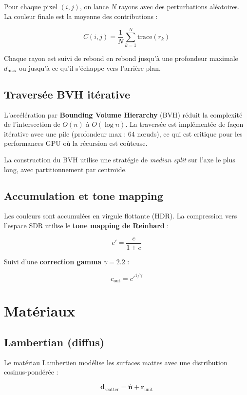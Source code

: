 \documentclass[12pt,a4paper]{article}
\begin{document}
Pour chaque pixel $(i, j)$, on lance $N$ rayons avec des perturbations aléatoires.
La couleur finale est la moyenne des contributions :

\[
C(i,j) = \frac{1}{N} \sum_{k=1}^{N} \text{trace}(r_k)
\]

Chaque rayon est suivi de rebond en rebond jusqu'à une profondeur maximale $d_{\max}$
ou jusqu'à ce qu'il s'échappe vers l'arrière-plan.

\subsection{Traversée BVH itérative}

L'accélération par \textbf{Bounding Volume Hierarchy} (BVH) réduit la complexité
de l'intersection de $O(n)$ à $O(\log n)$. La traversée est implémentée de façon
itérative avec une pile (profondeur max : 64 nœuds), ce qui est critique pour
les performances GPU où la récursion est coûteuse.

La construction du BVH utilise une stratégie de \textit{median split} sur l'axe
le plus long, avec partitionnement par centroïde.

\subsection{Accumulation et tone mapping}

Les couleurs sont accumulées en virgule flottante (HDR). La compression vers
l'espace SDR utilise le \textbf{tone mapping de Reinhard} :

\[
c' = \frac{c}{1 + c}
\]

Suivi d'une \textbf{correction gamma} $\gamma = 2.2$ :

\[
c_{\text{out}} = c'^{1/\gamma}
\]

\section{Matériaux}

\subsection{Lambertian (diffus)}

Le matériau Lambertien modélise les surfaces mattes avec une distribution
cosinus-pondérée :

\[
\bm{d}_{\text{scatter}} = \hat{\bm{n}} + \bm{r}_{\text{unit}}
\]
\end{document}
